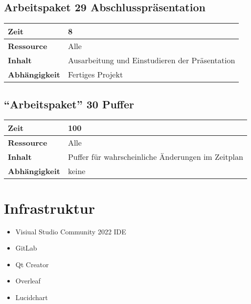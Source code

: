 \documentclass[12pt,a4paper,onecolumn]{article}
\begin{document}
\subsection{Arbeitspaket 29 Abschlusspräsentation}
\begin{tabularx}{\textwidth}{|l|X|}
\hline
     \textbf{Zeit} &  8\\
     \hline
     \textbf{Ressource} & Alle\\
     \hline
     \textbf{Inhalt} &  Ausarbeitung und Einstudieren der Präsentation\\
     \hline
     \textbf{Abhängigkeit} & Fertiges Projekt\\
\hline
\end{tabularx}
\subsection{``Arbeitspaket'' 30 Puffer}
\begin{tabularx}{\textwidth}{|l|X|}
\hline
     \textbf{Zeit} &  100\\
     \hline
     \textbf{Ressource} & Alle\\
     \hline
     \textbf{Inhalt} &  Puffer für wahrscheinliche Änderungen im Zeitplan\\
     \hline
     \textbf{Abhängigkeit} & keine\\
\hline
\end{tabularx}
\section{Infrastruktur}
\begin{itemize}
    \item Visiual Studio Community 2022 IDE
    \item GitLab
    \item Qt Creator
    \item Overleaf
    \item Lucidchart
\end{itemize}
\end{document}
